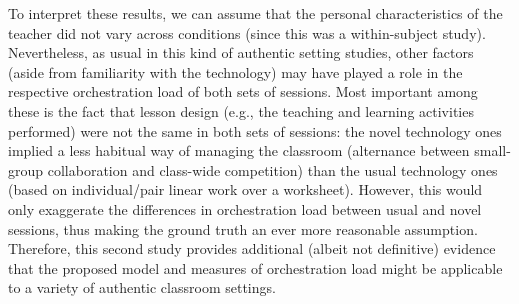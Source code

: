 \documentclass[10pt,journal,compsoc]{IEEEtran}
\begin{document}
To interpret these results, we can assume that the personal characteristics of the teacher did not vary across conditions (since this was a within-subject study). Nevertheless, as usual in this kind of authentic setting studies, other factors (aside from familiarity with the technology) may have played a role in the respective orchestration load of both sets of sessions. Most important among these is the fact that lesson design (e.g., the teaching and learning activities performed) were not the same in both sets of sessions: the novel technology ones implied a less habitual way of managing the classroom (alternance between small-group collaboration and class-wide competition) than the usual technology ones (based on individual/pair linear work over a worksheet). However, this would only exaggerate the differences in orchestration load between usual and novel sessions, thus making the ground truth an ever more reasonable assumption. Therefore, this second study provides additional (albeit not definitive) evidence that the proposed model and measures of orchestration load might be applicable to a variety of authentic classroom settings.

\end{document}
